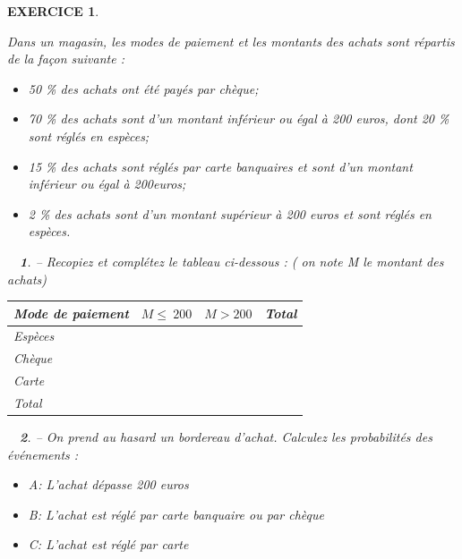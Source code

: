 \documentclass[a4paper]{article}   %
\renewcommand{\(}{\left(}
\renewcommand{\)}{\right)}
\newtheorem{ques}{~}
\newenvironment{qu}{\begin{ques}--} {\end{ques}}
\newtheorem{EXO}{\large EXERCICE }
\newenvironment{EX}   { \setcounter{ques}{0} \begin{EXO} \hrulefill ~\vspace{0.3cm}

\normalfont}    {\end{EXO} \medskip}
\newcommand{\ie}{\leqslant ~}  		%
\begin{document}
\begin{EX}
Dans un magasin, les modes de paiement et les montants des achats sont répartis de la façon suivante :
\begin{itemize}
\item 50 \% des achats ont été payés par chèque;
\item 70 \% des achats sont d'un montant inférieur ou égal à 200 euros, dont 20 \% sont réglés en espèces;
\item 15 \% des achats sont réglés par carte banquaires et sont d'un montant inférieur ou égal à 200euros;
\item 2 \% des achats sont d'un montant supérieur à 200 euros et sont réglés en espèces.
\end{itemize}

\begin{qu}
Recopiez et complétez le tableau ci-dessous : ( on note M le montant des achats)
\begin{center}
\begin{tabular}{|p{4cm}| p{3cm}|p{3cm}|p{3cm}|}		%
\hline							%
Mode de paiement & $M \ie 200$ & $ M>200$ & Total \\
\hline
Espèces & & &  \\
\hline
Chèque & & & \\
\hline
Carte & & & \\
\hline
Total & & & \\
\hline
\end{tabular}
\end{center}

\end{qu}

\begin{qu}
On prend au hasard un bordereau d'achat. Calculez les probabilités des événements : 
\begin{itemize}
\item A: \og L'achat dépasse 200 euros \fg
\item B: \og L'achat est réglé par carte banquaire ou par chèque \fg
\item C: \og L'achat est réglé par carte \fg 
\end{itemize}
\end{qu}

\end{EX}
\end{document}
